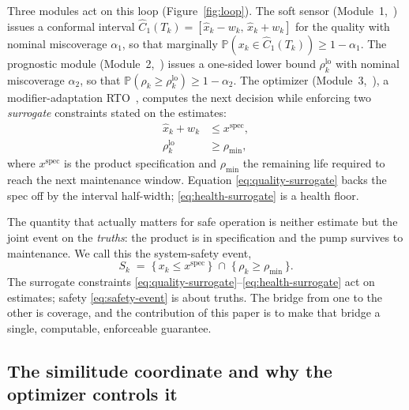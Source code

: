 Three modules act on this loop (Figure~\ref{fig:loop}). The soft sensor (Module~1,~\citet{busico_m1})
issues a conformal interval $\hat C_1(T_k) = [\hat x_k - w_k,\, \hat x_k + w_k]$
for the quality with nominal miscoverage $\alpha_1$, so that marginally
$\mathbb{P}(x_k \in \hat C_1(T_k)) \ge 1-\alpha_1$. The prognostic module
(Module~2,~\citet{busico_m2}) issues a one-sided lower bound $\rho_k^{\mathrm{lo}}$
with nominal miscoverage $\alpha_2$, so that
$\mathbb{P}(\rho_k \ge \rho_k^{\mathrm{lo}}) \ge 1-\alpha_2$. The optimizer
(Module~3,~\citet{busico_m3}), a modifier-adaptation
RTO~\citep{marchetti2009,chachuat2009}, computes the next decision while enforcing
two \emph{surrogate} constraints stated on the estimates:
\begin{align}
\hat x_k + w_k &\le x^{\mathrm{spec}}, \label{eq:quality-surrogate}\\
\rho_k^{\mathrm{lo}} &\ge \rho_{\min}, \label{eq:health-surrogate}
\end{align}
where $x^{\mathrm{spec}}$ is the product specification and $\rho_{\min}$ the
remaining life required to reach the next maintenance window. Equation
\eqref{eq:quality-surrogate} backs the spec off by the interval half-width;
\eqref{eq:health-surrogate} is a health floor.

The quantity that actually matters for safe operation is neither estimate but the
joint event on the \emph{truths}: the product is in specification and the pump
survives to maintenance. We call this the system-safety event,
\begin{equation}
S_k \;=\; \{\, x_k \le x^{\mathrm{spec}} \,\} \;\cap\; \{\, \rho_k \ge \rho_{\min} \,\}.
\label{eq:safety-event}
\end{equation}
The surrogate constraints \eqref{eq:quality-surrogate}--\eqref{eq:health-surrogate}
act on estimates; safety \eqref{eq:safety-event} is about truths. The bridge from
one to the other is coverage, and the contribution of this paper is to make that
bridge a single, computable, enforceable guarantee.

\subsection{The similitude coordinate and why the optimizer controls it}
\label{sec:psi}


